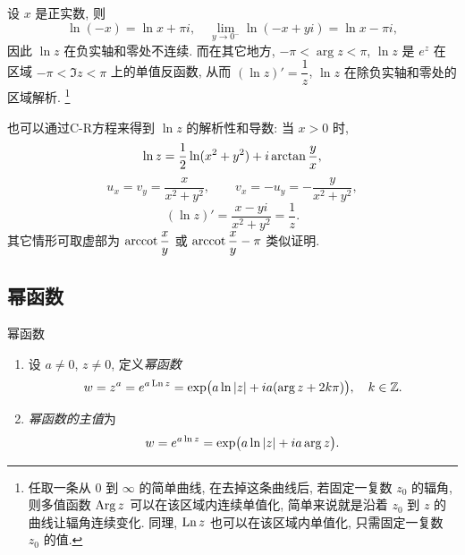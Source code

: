 设 $x$ 是正实数, 则
\[\ln (-x)=\ln x+\pi i,\quad
  \lim_{y\to0^-}\ln (-x+yi)=\ln x-\pi i,\]
因此 $\ln z$ 在负实轴和零处不连续.
而在其它地方, $-\pi<\arg z<\pi$, $\ln z$ 是 $e^z$ 在区域 $-\pi<\Im z<\pi$ 上的单值反函数, 
从而 \alert{$(\ln z)'=\dfrac 1z$}, \alert{$\ln z$ 在除负实轴和零处的区域解析}.
\footnote{任取一条从 $0$ 到 $\infty$ 的简单曲线, 在去掉这条曲线后, 若固定一复数 $z_0$ 的辐角, 则多值函数 $\operatorname{Arg} z$ 可以在该区域内连续单值化, 简单来说就是沿着 $z_0$ 到 $z$ 的曲线让辐角连续变化. 同理, $\operatorname{Ln} z$ 也可以在该区域内单值化, 只需固定一复数 $z_0$ 的值.}

也可以通过C-R方程来得到 $\ln z$ 的解析性和导数: 当 $x>0$ 时,
\[\ln z=\frac{1}{2} \ln(x^2+y^2)+i\arctan \frac yx,\]
\[u_x=v_y=\frac x{x^2+y^2},\qquad v_x=-u_y=-\frac y{x^2+y^2},\]
\[(\ln z)'=\frac{x-yi}{x^2+y^2}=\frac 1z.\]
其它情形可取虚部为 $\operatorname{arccot}\dfrac xy$ 或 $\operatorname{arccot}\dfrac xy-\pi$ 类似证明.

\subsection{幂函数}

\begin{definition}{幂函数}
	\begin{enumerate}
		\item 设 $a\neq 0$, $z\neq 0$, 定义\emph{幂函数}
		\[w=z^a=e^{a\operatorname{Ln} z}
		=\exp\bigl(a\ln\left|z\right|+ia(\arg z+2k\pi)\bigr),\quad k\in{\mathbb{Z}}.\]
		\item \emph{幂函数的主值}为
		\[w=e^{a\ln z}=\exp\bigl(a\ln\left|z\right|+ia\arg z\bigr).\]
	\end{enumerate}
\end{definition}


